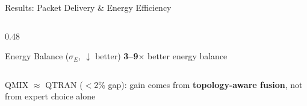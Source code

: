 \documentclass[aspectratio=169, 11pt]{beamer}
\begin{document}
\begin{frame}{Results: Packet Delivery \& Energy Efficiency}
\begin{columns}[T]
\begin{column}{0.48\textwidth}
\begin{block}{Energy Balance ($\sigma_E$, $\downarrow$ better)}
  \vspace{4pt}
  \textcolor{polygreen}{\textbf{3--9$\times$}} better energy balance
  \end{block}

\end{column}
\end{columns}

\vspace{6pt}
\centering
\colorbox{polyblue!10}{\parbox{0.85\textwidth}{\centering
  QMIX $\approx$ QTRAN ($<$2\% gap): gain comes from \textbf{topology-aware fusion}, not from expert choice alone
}}

\end{frame}

\end{document}

